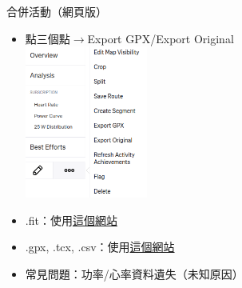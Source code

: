 \begin{frame}[fragile]{合併活動（網頁版）}
\begin{multicols}{2}
\begin{itemize}
\item 點三個點$\to$Export GPX/Export Original\\
\includegraphics[height=5cm]{cropSplit.png}\pause
\item .fit：使用\href{https://www.fitfiletools.com/#/top}{這個網站}\pause
\item .gpx, .tcx, .csv：使用\href{https://gotoes.org/strava/}{這個網站}\pause
\item 常見問題：功率/心率資料遺失（未知原因）
\end{itemize}
\end{multicols}
\end{frame}

